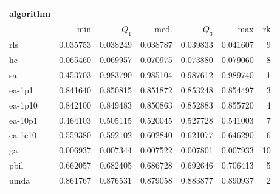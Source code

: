 \begin{tabular}{@{}l*{5}{>{{}}N{1}{3}}>{{}}N{2}{0}@{}}
\toprule
{algorithm} &  \\
\midrule
& {min} & {$Q_1$} & {med.} & {$Q_3$} & {max} & {rk}\\
\midrule
rls & 0.035753 & 0.038249 & 0.038787 & 0.039833 & 0.041607 & 9\\
hc & 0.065460 & 0.069957 & 0.070975 & 0.073880 & 0.079060 & 8\\
sa & 0.453703 & {\color{blue}} 0.983790 & {\color{blue}} 0.985104 & {\color{blue}} 0.987612 & {\color{blue}} 0.989740 & 1\\
ea-1p1 & 0.841640 & 0.850815 & 0.851872 & 0.853248 & 0.854497 & 3\\
ea-1p10 & 0.842100 & 0.849483 & 0.850863 & 0.852883 & 0.855720 & 4\\
ea-10p1 & 0.464103 & 0.505115 & 0.520045 & 0.527728 & 0.541003 & 7\\
ea-1c10 & 0.559380 & 0.592102 & 0.602840 & 0.621077 & 0.646290 & 6\\
ga & 0.006937 & 0.007344 & 0.007522 & 0.007801 & 0.007933 & 10\\
pbil & 0.662057 & 0.682405 & 0.686728 & 0.692646 & 0.706413 & 5\\
umda & {\color{blue}} 0.861767 & 0.876531 & 0.879058 & 0.883877 & 0.890937 & 2\\
\bottomrule
\end{tabular}
